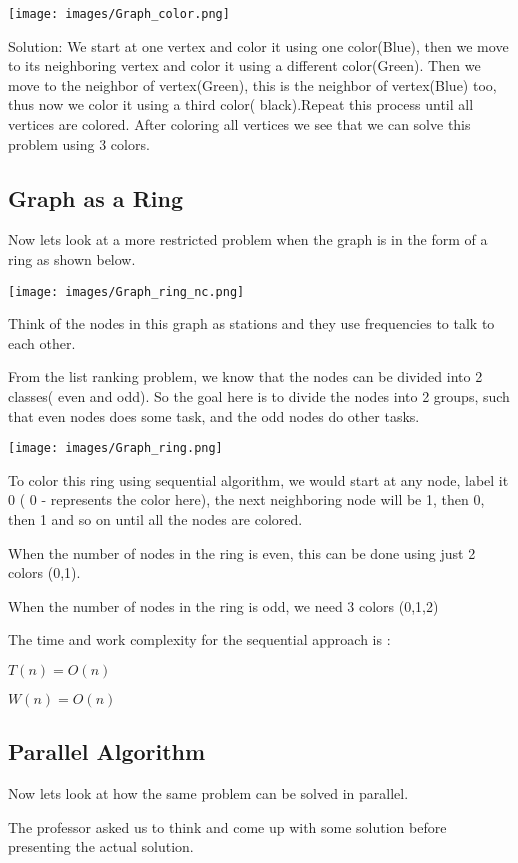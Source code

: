 \documentclass[twoside]{article}
\begin{document}
\texttt{[image: images/Graph\_color.png]}

Solution: We start at one vertex and color it using one color(Blue), then we move to its neighboring vertex and color it using a different color(Green). Then we move to the neighbor of vertex(Green), this is the neighbor of vertex(Blue) too, thus now we color it using a third color( black).Repeat this process until all vertices are colored.
After coloring all vertices we see that we can solve this problem using 3 colors.

\subsection{Graph as a Ring}
Now lets look at a more restricted problem when the graph is in the form of a ring as shown below.

\texttt{[image: images/Graph\_ring\_nc.png]}

Think of the nodes in this graph as stations and they use frequencies to talk to each other.

From the list ranking problem, we know that the nodes can be divided into 2 classes( even and odd). So the goal here is to divide the nodes into 2 groups, such that even nodes does some task, and the odd nodes do other tasks.

\texttt{[image: images/Graph\_ring.png]}

To color this ring using sequential algorithm, we would start at any node, label it 0 ( 0 - represents the color here), the next neighboring node will be 1, then 0, then 1 and so on until all the nodes are colored. 

When the number of nodes in the ring is even, this can be done using just 2 colors (0,1). 

When the number of nodes in the ring is odd, we need 3 colors (0,1,2)


The time and work complexity for the sequential approach is :

$T(n) = O(n)$

$W(n) = O(n)$


\subsection{Parallel Algorithm}
Now lets look at how the same problem can be solved in parallel. 

The professor asked us to think and come up with some solution before presenting the actual solution.
\end{document}
